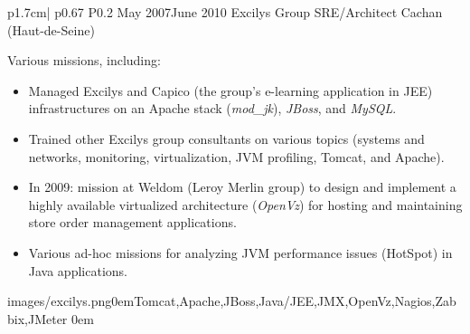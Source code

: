 \begin{longtable}{p{1.7cm}| p{} P{0.2\textwidth}}
    {May 2007\newline June 2010}
    {Excilys Group}
    {SRE/Architect}
    {Cachan (Haut-de-Seine)\color{cvred}}
    {
      Various missions, including:
      \begin{itemize}
        \item Managed Excilys and Capico (the group's e-learning application in JEE) infrastructures on an Apache stack (\emph{mod\_jk}), \emph{JBoss}, and \emph{MySQL}.
        \item Trained other Excilys group consultants on various topics (systems and networks, monitoring, virtualization, JVM profiling, Tomcat, and Apache).
        \item In 2009: mission at Weldom (Leroy Merlin group) to design and implement a highly available virtualized architecture (\emph{OpenVz}) for hosting and maintaining store order management applications.
        \item Various ad-hoc missions for analyzing JVM performance issues (HotSpot) in Java applications.
      \end{itemize}
    }
    {images/excilys.png}{0em}{Tomcat,Apache,JBoss,Java/JEE,JMX,OpenVz,Nagios,Zabbix,JMeter}
    {0em} \\
\end{longtable}



